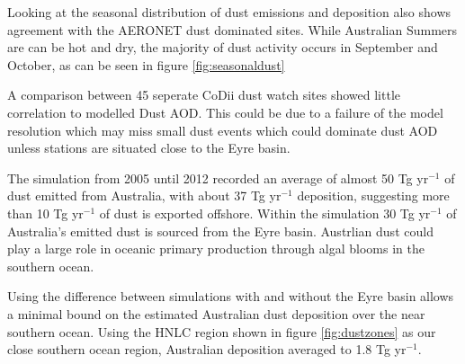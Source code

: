 
Looking at the seasonal distribution of dust emissions and deposition also shows agreement with the AERONET dust dominated sites.
While Australian Summers are can be hot and dry, the majority of dust activity occurs in September and October, as can be seen in figure \ref{fig:seasonaldust}

A comparison between 45 seperate CoDii dust watch sites showed little correlation to modelled Dust AOD.
This could be due to a failure of the model resolution which may miss small dust events which could dominate dust AOD unless stations are situated close to the Eyre basin.

The simulation from 2005 until 2012 recorded an average of almost 50 Tg yr$^{-1}$ of dust emitted from Australia, with about 37 Tg yr$^{-1}$ deposition, suggesting more than 10 Tg yr$^{-1}$ of dust is exported offshore.
Within the simulation 30 Tg yr$^{-1}$ of Australia's emitted dust is sourced from the Eyre basin.
Austrlian dust could play a large role in oceanic primary production through algal blooms in the southern ocean.

Using the difference between simulations with and without the Eyre basin allows a minimal bound on the estimated Australian dust deposition over the near southern ocean.
Using the HNLC region shown in figure \ref{fig:dustzones} as our close southern ocean region, Australian deposition averaged to 1.8 Tg yr$^{-1}$.